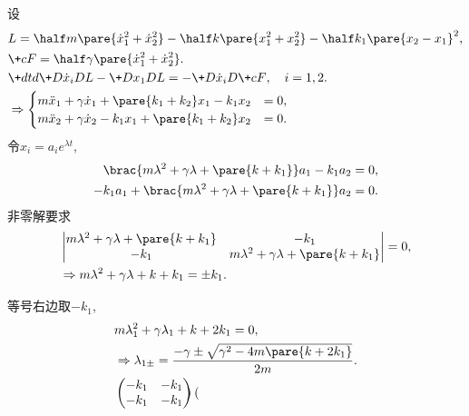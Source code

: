 \documentclass[../LectureNotes.tex]{subfiles}
\begin{document}
\begin{sample}
    \begin{ex}
        设
        \begin{align*}
            & L = \half m\pare{\dot{x}_1^2 + \dot{x}_2^2} - \half k\pare{x_1^2 + x_2^2} - \half k_1 \pare{x_2-x_1}^2, \\
            & \+cF = \half \gamma\pare{\dot{x}_1^2 + \dot{x}_2^2}. \\
            & \+dtd{} \+D{\dot{x}_i}DL - \+D{x_1}DL = -\+D{\dot{x}_i}D{\+cF},\quad i=1,2. \\
            & \Rightarrow \begin{cases}
                m\ddot{x}_1 + \gamma\dot{x}_1 + \pare{k_1+k_2}x_1 - k_1 x_2 &= 0, \\
                m\ddot{x}_2 + \gamma\dot{x}_2 - k_1x_1 + \pare{k_1+k_2}x_2 &= 0.
            \end{cases}
        \end{align*}
        令$x_i = a_ie^{\lambda t}$,
        \begin{align*}
            \brac{m\lambda^2 + \gamma\lambda + \pare{k+k_1}}a_1 - k_1 a_2 &= 0, \\
            -k_1a_1 + \brac{m\lambda^2 + \gamma\lambda + \pare{k+k_1}} a_2 &= 0.
        \end{align*}
        非零解要求
        \begin{align*}
            & \begin{vmatrix}
                m\lambda^2 + \gamma\lambda + \pare{k+k_1} & -k_1 \\
                -k_1 & m\lambda^2 + \gamma\lambda + \pare{k+k_1}
            \end{vmatrix} = 0, \\
            & \Rightarrow m\lambda^2 + \gamma\lambda + k + k_1 = \pm k_1.
        \end{align*}
        \begin{cenum}
            \item 等号右边取$-k_1$,
            \begin{align*}
                & m\lambda_1^2 + \gamma\lambda_1 + k + 2k_1 = 0, \\
                & \Rightarrow \lambda_{1\pm} = \frac{-\gamma \pm \sqrt{\gamma^2 - 4m\pare{k+2k_1}}}{2m}. \\
                & \begin{pmatrix}
                    -k_1 & -k_1 \\
                    -k_1 & -k_1
                \end{pmatrix}\begin{pmatrix}

\end{pmatrix}
\end{align*}
\end{cenum}
\end{ex}
\end{sample}
\end{document}
